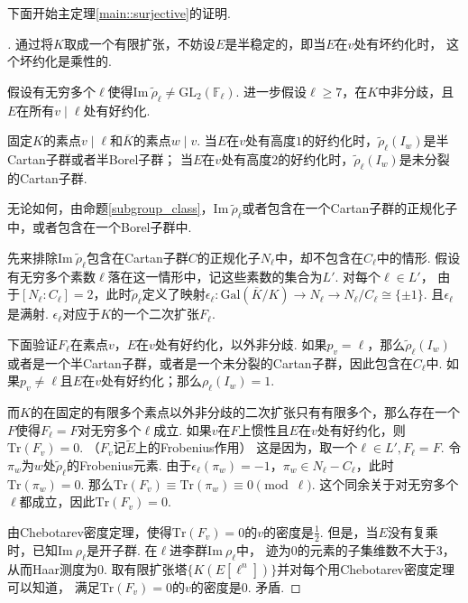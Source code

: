 下面开始主定理\ref{main::surjective}的证明.
\begin{proof}[]
    通过将$K$取成一个有限扩张，不妨设$E$是半稳定的，即当$E$在$v$处有坏约化时，
    这个坏约化是乘性的.

    假设有无穷多个$\ell$使得$\mathrm{Im}\ \tilde{\rho}_{\ell}\neq \mathrm{GL}_2(\mathbb{F}_{\ell})$.
    进一步假设$\ell\geq 7$，在$K$中非分歧，且$E$在所有$v\mid \ell$处有好约化.

    固定$K$的素点$v\mid \ell$和$\overline{K}$的素点$w\mid v$.
    当$E$在$v$处有高度$1$的好约化时，$\tilde{\rho}_{\ell}(I_w)$是半Cartan子群或者半Borel子群；
    当$E$在$v$处有高度$2$的好约化时，$\tilde{\rho}_{\ell}(I_w)$是未分裂的Cartan子群.
    
    无论如何，由命题\ref{subgroup_class}，$\mathrm{Im}\ \tilde{\rho}_{\ell}$或者包含在一个Cartan子群的正规化子中，或者包含在一个Borel子群中.
    \vskip0.3cm

    先来排除$\mathrm{Im}\ \tilde{\rho}_{\ell}$包含在Cartan子群$C$的正规化子$N_{\ell}$中，却不包含在$C_{\ell}$中的情形.
    假设有无穷多个素数$\ell$落在这一情形中，记这些素数的集合为$L'$. 对每个$\ell\in L'$，
    由于$[N_{\ell}:C_{\ell}]=2$，此时$\tilde{\rho}_{\ell}$定义了映射$\epsilon_{\ell}:\mathrm{Gal}(\overline{K}/K) \to N_{\ell}\to N_{\ell}/C_{\ell} \cong \{\pm 1\}$. 且$\epsilon_{\ell}$是满射.
    $\epsilon_{\ell}$对应于$K$的一个二次扩张$F_{\ell}$.

    下面验证$F_{\ell}$在素点$v$，$E$在$v$处有好约化，以外非分歧.
    如果$p_v=\ell$，那么$\tilde{\rho}_{\ell}(I_w)$或者是一个半Cartan子群，或者是一个未分裂的Cartan子群，因此包含在$C_{\ell}$中. 如果$p_v\neq \ell$且$E$在$v$处有好约化；那么$\rho_{\ell}(I_w) = 1$.

    而$K$的在固定的有限多个素点以外非分歧的二次扩张只有有限多个，那么存在一个$F$使得$F_{\ell} =F$对无穷多个$\ell$成立.
    如果$v$在$F$上惯性且$E$在$v$处有好约化，则$\mathrm{Tr}(F_v) = 0$.
    （$F_v$记$\tilde{E}$上的Frobenius作用）
    这是因为，取一个$\ell\in L',F_{\ell}=F$.
    令$\pi_w$为$w$处$\tilde{\rho}_{\ell}$的Frobenius元素.
    由于$\epsilon_{\ell}(\pi_{w})=-1$，$\pi_{w}\in N_{\ell}-C_{\ell}$，此时$\mathrm{Tr}(\pi_w)=0$.
    那么$\mathrm{Tr}(F_v)\equiv \mathrm{Tr}(\pi_{w})\equiv 0\pmod{\ell}$.
    这个同余关于对无穷多个$\ell$都成立，因此$\mathrm{Tr}(F_v) = 0$.

    由Chebotarev密度定理，使得$\mathrm{Tr}(F_v)= 0$的$v$的密度是$\frac{1}{2}$.
    但是，当$E$没有复乘时，已知$\mathrm{Im}\ \rho_{\ell}$是开子群.
    在$\ell$进李群$\mathrm{Im}\ \rho_{\ell}$中，
    迹为$0$的元素的子集维数不大于$3$，从而Haar测度为$0$.
    取有限扩张塔$\{K(E[\ell^n])\}$并对每个用Chebotarev密度定理可以知道，
    满足$\mathrm{Tr}(F_v)=0$的$v$的密度是$0$. 矛盾.


\end{proof}
